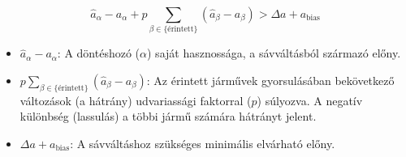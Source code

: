 \documentclass[14pt,a4paper]{extarticle}
\begin{document}
$$\hat{a}_{\alpha} - a_{\alpha} + p \sum_{\beta \in \{\text{érintett}\}} (\hat{a}_{\beta} - a_{\beta}) > \Delta a + a_{\text{bias}}$$

\begin{itemize}
	\item $\hat{a}_{\alpha} - a_{\alpha}$: A döntéshozó ($\alpha$) saját hasznossága, a sávváltásból származó előny.
	\item $p \sum_{\beta \in \{\text{érintett}\}} (\hat{a}_{\beta} - a_{\beta})$: Az érintett járművek gyorsulásában bekövetkező változások (a hátrány) udvariassági faktorral ($p$) súlyozva. A negatív különbség (lassulás) a többi jármű számára hátrányt jelent.
	\item $\Delta a + a_{\text{bias}}$: A sávváltáshoz szükséges minimális elvárható előny.
\end{itemize}
\end{document}
